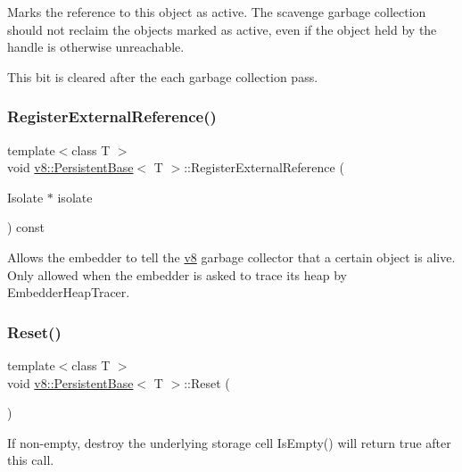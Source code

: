 Marks the reference to this object as active. The scavenge garbage collection should not reclaim the objects marked as active, even if the object held by the handle is otherwise unreachable.

This bit is cleared after the each garbage collection pass. \mbox{\label{classv8_1_1PersistentBase_a427ad28478a6a208605fca3d39ce4bdf}} 
\subsubsection{\texorpdfstring{Register\+External\+Reference()}{RegisterExternalReference()}}
{\footnotesize\ttfamily template$<$class T $>$ \\
void \mbox{\hyperlink{classv8_1_1PersistentBase}{v8\+::\+Persistent\+Base}}$<$ T $>$\+::Register\+External\+Reference (\begin{DoxyParamCaption}\item[{Isolate $\ast$}]{isolate }\end{DoxyParamCaption}) const}

Allows the embedder to tell the \mbox{\hyperlink{namespacev8}{v8}} garbage collector that a certain object is alive. Only allowed when the embedder is asked to trace its heap by Embedder\+Heap\+Tracer. \mbox{\label{classv8_1_1PersistentBase_a174bb1e45b18fd4eeaee033622825bb8}} 
\subsubsection{\texorpdfstring{Reset()}{Reset()}\hspace{0.1cm}{\footnotesize\ttfamily [1/3]}}
{\footnotesize\ttfamily template$<$class T $>$ \\
void \mbox{\hyperlink{classv8_1_1PersistentBase}{v8\+::\+Persistent\+Base}}$<$ T $>$\+::Reset (\begin{DoxyParamCaption}{ }\end{DoxyParamCaption})}

If non-\/empty, destroy the underlying storage cell Is\+Empty() will return true after this call. \mbox{\label{classv8_1_1PersistentBase_a11164f0dfc9a16d79809236e7a9670aa}} 
